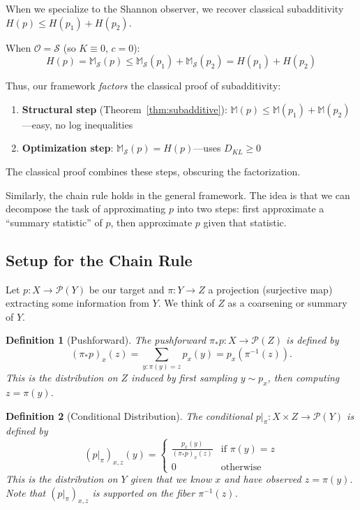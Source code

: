 \documentclass[11pt]{article}
\newtheorem{definition}{Definition}
\begin{document}
When we specialize to the Shannon observer, we recover classical subadditivity $H(p) \leq H(p_1) + H(p_2)$.

When $\mathcal{O} = \mathcal{S}$ (so $K \equiv 0$, $c = 0$):
\begin{equation}
H(p) = \mathbb{M}_{\mathcal{S}}(p) \leq \mathbb{M}_{\mathcal{S}}(p_1) + \mathbb{M}_{\mathcal{S}}(p_2) = H(p_1) + H(p_2)
\end{equation}

Thus, our framework \emph{factors} the classical proof of subadditivity:
\begin{enumerate}
    \item \textbf{Structural step} (Theorem~\ref{thm:subadditive}): $\mathbb{M}(p) \leq \mathbb{M}(p_1) + \mathbb{M}(p_2)$---easy, no log inequalities
    \item \textbf{Optimization step}: $\mathbb{M}_{\mathcal{S}}(p) = H(p)$---uses $D_{KL} \geq 0$
\end{enumerate}

The classical proof combines these steps, obscuring the factorization.

Similarly, the chain rule holds in the general framework. The idea is that we can decompose the task of approximating $p$ into two steps: first approximate a ``summary statistic'' of $p$, then approximate $p$ given that statistic.

\subsection*{Setup for the Chain Rule}

Let $p: X \to \mathcal{P}(Y)$ be our target and $\pi: Y \to Z$ a projection (surjective map) extracting some information from $Y$. We think of $Z$ as a coarsening or summary of $Y$.

\begin{definition}[Pushforward]
The pushforward $\pi_* p: X \to \mathcal{P}(Z)$ is defined by
\[ (\pi_* p)_{x}(z) = \sum_{y: \pi(y) = z} p_x(y) = p_x(\pi^{-1}(z)). \]
This is the distribution on $Z$ induced by first sampling $y \sim p_x$, then computing $z = \pi(y)$.
\end{definition}

\begin{definition}[Conditional Distribution]
The conditional $p|_\pi: X \times Z \to \mathcal{P}(Y)$ is defined by
\[ (p|_\pi)_{x,z}(y) = \begin{cases} \frac{p_x(y)}{(\pi_* p)_x(z)} & \text{if } \pi(y) = z \\ 0 & \text{otherwise} \end{cases} \]
This is the distribution on $Y$ given that we know $x$ and have observed $z = \pi(y)$.
Note that $(p|_\pi)_{x,z}$ is supported on the fiber $\pi^{-1}(z)$.
\end{definition}
\end{document}
